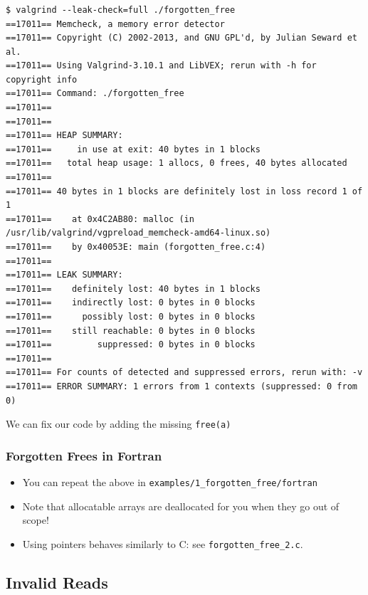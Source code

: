 \documentclass{beamer}
\begin{document}
\begin{frame}[fragile]
  \frametitle{}
  \begin{lstlisting}
$ valgrind --leak-check=full ./forgotten_free
==17011== Memcheck, a memory error detector
==17011== Copyright (C) 2002-2013, and GNU GPL'd, by Julian Seward et al.
==17011== Using Valgrind-3.10.1 and LibVEX; rerun with -h for copyright info
==17011== Command: ./forgotten_free
==17011==
==17011==
==17011== HEAP SUMMARY:
==17011==     in use at exit: 40 bytes in 1 blocks
==17011==   total heap usage: 1 allocs, 0 frees, 40 bytes allocated
==17011==
==17011== 40 bytes in 1 blocks are definitely lost in loss record 1 of 1
==17011==    at 0x4C2AB80: malloc (in /usr/lib/valgrind/vgpreload_memcheck-amd64-linux.so)
==17011==    by 0x40053E: main (forgotten_free.c:4)
==17011==
==17011== LEAK SUMMARY:
==17011==    definitely lost: 40 bytes in 1 blocks
==17011==    indirectly lost: 0 bytes in 0 blocks
==17011==      possibly lost: 0 bytes in 0 blocks
==17011==    still reachable: 0 bytes in 0 blocks
==17011==         suppressed: 0 bytes in 0 blocks
==17011==
==17011== For counts of detected and suppressed errors, rerun with: -v
==17011== ERROR SUMMARY: 1 errors from 1 contexts (suppressed: 0 from 0)
  \end{lstlisting}

  We can fix our code by adding the missing \lstinline{free(a)}

\end{frame}

\begin{frame}[fragile]
  \frametitle{Forgotten Frees in Fortran}
  \begin{itemize}
    \item You can repeat the above in \texttt{examples/1\_forgotten\_free/fortran}
      \item Note that allocatable arrays are deallocated for you when they go out of scope!
      \item Using pointers behaves similarly to C: see \texttt{forgotten\_free\_2.c}.
  \end{itemize}

\end{frame}


\subsection{Invalid Reads}
\end{document}

